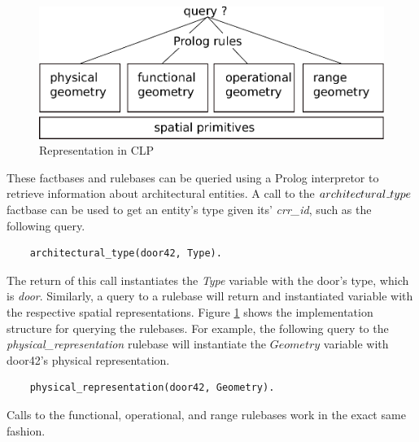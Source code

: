 \documentclass[12pt]{ucthesis}
\begin{document}
\begin{figure}[H]
\centering
\includegraphics[width=120mm]{clp-design}
\caption{Representation in CLP}
\label{clp-design}
\end{figure}

These factbases and rulebases can be queried using a Prolog interpretor to retrieve information about architectural entities. A call to the $architectural \mathunderscore type$ factbase can be used to get an entity's type given its' \emph{crr\_id}, such as the following query.
\begin{verbatim}
    architectural_type(door42, Type).
\end{verbatim} The return of this call instantiates the \emph{Type} variable with the door's type, which is \emph{door}. Similarly, a query to a rulebase will return and instantiated variable with the respective spatial representations. Figure \ref{clp-design} shows the implementation structure for querying the rulebases. For example, the following query to the \emph{physical\_representation} rulebase will instantiate the $Geometry$ variable with door42's physical representation. \begin{verbatim}
    physical_representation(door42, Geometry).
\end{verbatim} Calls to the functional, operational, and range rulebases work in the exact same fashion.



\end{document}
